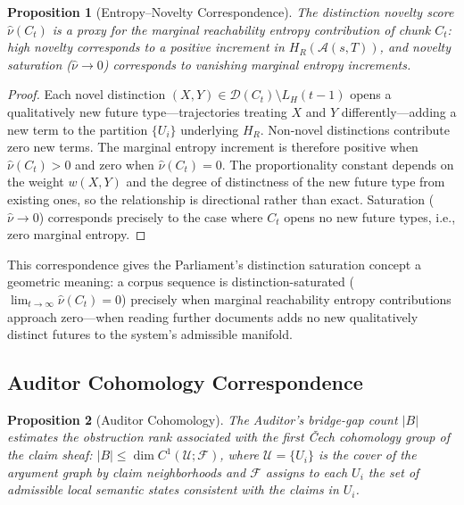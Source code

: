 \documentclass[12pt, a4paper]{article}
\theoremstyle{plain}
\newtheorem{proposition}{Proposition}
\theoremstyle{definition}
\theoremstyle{remark}
\begin{document}
\begin{proposition}[Entropy--Novelty Correspondence]
\label{prop:entropy}
The distinction novelty score $\hat{\nu}(C_t)$ is a proxy for the marginal reachability entropy contribution of chunk $C_t$: high novelty corresponds to a positive increment in $H_R(\mathcal{A}(s,T))$, and novelty saturation ($\hat{\nu} \to 0$) corresponds to vanishing marginal entropy increments.
\end{proposition}

\begin{proof}
Each novel distinction $(X,Y) \in \mathcal{D}(C_t) \setminus L_H(t-1)$ opens a qualitatively new future type---trajectories treating $X$ and $Y$ differently---adding a new term to the partition $\{U_i\}$ underlying $H_R$. Non-novel distinctions contribute zero new terms. The marginal entropy increment is therefore positive when $\hat{\nu}(C_t) > 0$ and zero when $\hat{\nu}(C_t) = 0$. The proportionality constant depends on the weight $w(X,Y)$ and the degree of distinctness of the new future type from existing ones, so the relationship is directional rather than exact. Saturation ($\hat{\nu} \to 0$) corresponds precisely to the case where $C_t$ opens no new future types, i.e., zero marginal entropy.
\end{proof}

This correspondence gives the Parliament's distinction saturation concept a geometric meaning: a corpus sequence is distinction-saturated ($\lim_{t\to\infty} \hat{\nu}(C_t) = 0$) precisely when marginal reachability entropy contributions approach zero---when reading further documents adds no new qualitatively distinct futures to the system's admissible manifold.

\subsection{Auditor Cohomology Correspondence}
\label{sec:auditor}

\begin{proposition}[Auditor Cohomology]
\label{prop:cohomology}
The Auditor's bridge-gap count $|B|$ estimates the obstruction rank associated with the first \v{C}ech cohomology group of the claim sheaf: $|B| \leq \dim C^1(\mathcal{U}; \mathcal{F})$, where $\mathcal{U} = \{U_i\}$ is the cover of the argument graph by claim neighborhoods and $\mathcal{F}$ assigns to each $U_i$ the set of admissible local semantic states consistent with the claims in $U_i$.
\end{proposition}
\end{document}
